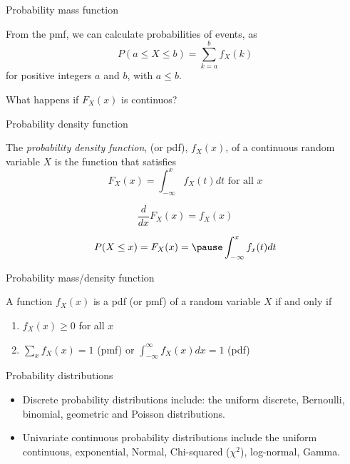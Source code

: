 \documentclass{beamer}
\begin{document}
\begin{frame}{Probability mass function}

	From the pmf, we can calculate probabilities of events, as 
	\begin{equation*}
		P(a \leq X \leq b) = \sum_{k=a}^b f_X(k)
	\end{equation*}
	for positive integers $a$ and $b$, with $a \leq b$.

	\vskip 1cm

	What happens if $F_X(x)$ is continuos?

\end{frame}

\begin{frame}{Probability density function}

        \begin{block}{}
		The \textit{probability density function}, (or pdf), $f_X(x)$, of a continuous random 
		variable $X$ is the function that satisfies
		\begin{equation*}
			F_X(x) = \int_{-\infty}^{x} f_X(t) dt \text{ for all } x
		\end{equation*}
        \end{block}

	\pause 

	\begin{equation*}
		\frac{d}{dx} F_X(x) = f_X(x)
	\end{equation*}

	\begin{equation*}
		P(X \leq x) = F_X(x) = \pause \int_{-\infty}^x f_x(t) dt
	\end{equation*}

\end{frame}

\begin{frame}{Probability mass/density function}

	A function $f_X(x)$ is a pdf (or pmf) of a random variable $X$ if and only if
	\begin{enumerate}
		\item $f_X(x) \geq 0$ for all $x$
		\item $\sum_x f_X(x)=1$ (pmf) or $\int_{-\infty}^{\infty} f_X(x) dx =1 $ (pdf)
	\end{enumerate}

\end{frame}

\begin{frame}{Probability distributions}

	\begin{itemize}
		\item Discrete probability distributions include: the uniform discrete, Bernoulli,
binomial, geometric and Poisson distributions.
		\item Univariate continuous probability distributions include the uniform continuous, exponential, Normal, Chi-squared ($\chi^2$), log-normal, Gamma.
	\end{itemize}

\end{frame}
\end{document}
